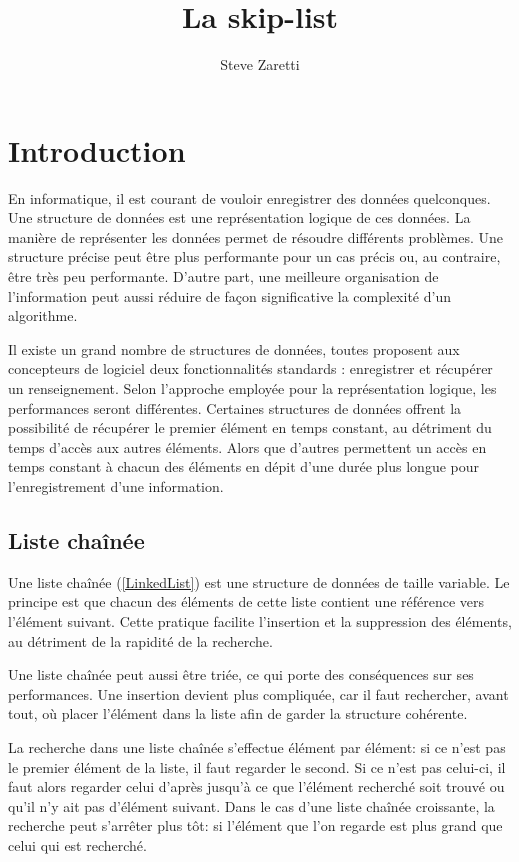 \documentclass[hidelinks,a4paper, 12pt]{article}
\title{ La skip-list }
\author{Steve Zaretti}
\begin{document}
	
	\maketitle
	\newpage
	\tableofcontents
	\newpage
	
	\section{Introduction}
	En informatique, il est courant de vouloir enregistrer des données quelconques. Une structure de données est une représentation logique de ces données. La manière de représenter les données permet de résoudre différents problèmes. Une structure précise peut être plus performante pour un cas précis ou, au contraire, être très peu performante. D’autre part, une meilleure organisation de l'information peut aussi réduire de façon significative la complexité d’un algorithme.
	
	Il existe un grand nombre de structures de données, toutes proposent aux concepteurs de logiciel deux fonctionnalités standards : enregistrer et récupérer un renseignement. Selon l’approche employée pour la représentation logique, les performances seront différentes. Certaines structures de données offrent la possibilité de récupérer le premier élément en temps constant, au détriment du temps d’accès aux autres éléments. Alors que d’autres permettent un accès en temps constant à chacun des éléments en dépit d’une durée plus longue pour l’enregistrement d'une information.
	
	\subsection{Liste chaînée}\label{linkList}
	Une liste chaînée (\cref{LinkedList}) est une structure de données de taille variable. Le principe est que chacun des éléments de cette liste contient une référence vers l'élément suivant. Cette pratique facilite l'insertion et la suppression des éléments, au détriment de la rapidité de la recherche.
	
	Une liste chaînée peut aussi être triée, ce qui porte des conséquences sur ses performances. Une insertion devient plus compliquée, car il faut rechercher, avant tout, où placer l'élément dans la liste afin de garder la structure cohérente.
	
	La recherche dans une liste chaînée s'effectue élément par élément: si ce n'est pas le premier élément de la liste, il faut regarder le second. Si ce n'est pas celui-ci, il faut alors regarder celui d'après jusqu'à ce que l'élément recherché soit trouvé ou qu'il n'y ait pas d'élément suivant. Dans le cas d'une liste chaînée croissante, la recherche peut s'arrêter plus tôt: si l'élément que l'on regarde est plus grand que celui qui est recherché.
	
\end{document}
